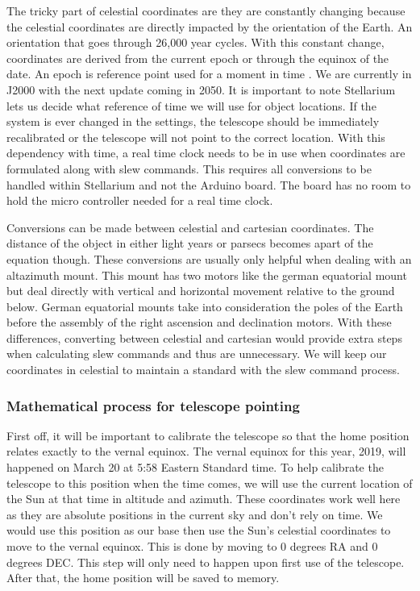 \documentclass[12pt]{report}
\begin{document}
\begin{enumerate}
The tricky part of celestial coordinates are they are constantly changing because the celestial coordinates are directly impacted by the orientation of the Earth. An orientation that goes through 26,000 year cycles. With this constant change, coordinates are derived from the current epoch or through the equinox of the date. An epoch is reference point used for a moment in time \cite{epoch}. We are currently in J2000 with the next update coming in 2050. It is important to note Stellarium lets us decide what reference of time we will use for object locations. If the system is ever changed in the settings, the telescope should be immediately recalibrated or the telescope will not point to the correct location. With this dependency with time, a real time clock needs to be in use when coordinates are formulated along with slew commands. This requires all conversions to be handled within Stellarium and not the Arduino board. The board has no room to hold the micro controller needed for a real time clock.

Conversions can be made between celestial and cartesian coordinates. The distance of the object in either light years or parsecs becomes apart of the equation though. These conversions are usually only helpful when dealing with an altazimuth mount. This mount has two motors like the german equatorial mount but deal directly with vertical and horizontal movement relative to the ground below. German equatorial mounts take into consideration the poles of the Earth before the assembly of the right ascension and declination motors. With these differences, converting between celestial and cartesian would provide extra steps when calculating slew commands and thus are unnecessary. We will keep our coordinates in celestial to maintain a standard with the slew command process.

\subsubsection*{Mathematical process for telescope pointing}

First off, it will be important to calibrate the telescope so that the home position relates exactly to the vernal equinox. The vernal equinox for this year, 2019, will happened on March 20 at 5:58 Eastern Standard time. To help calibrate the telescope to this position when the time comes, we will use the current location of the Sun at that time in altitude and azimuth. These coordinates work well here as they are absolute positions in the current sky and don’t rely on time. We would use this position as our base then use the Sun’s celestial coordinates to move to the vernal equinox. This is done by moving to 0 degrees RA and 0 degrees DEC. This step will only need to happen upon first use of the telescope. After that, the home position will be saved to memory.


\end{enumerate}
\end{document}
